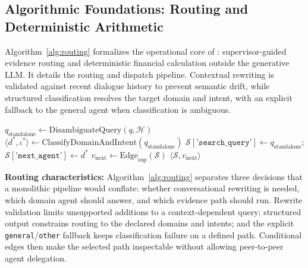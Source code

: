 \subsection{Algorithmic Foundations: Routing and Deterministic Arithmetic}
\label{sec:algorithms}

Algorithm~\ref{alg:routing} formalizes the operational core of \system{}: supervisor-guided evidence routing and deterministic financial calculation outside the generative LLM. It details the routing and dispatch pipeline. Contextual rewriting is validated against recent dialogue history to prevent semantic drift, while structured classification resolves the target domain and intent, with an explicit fallback to the general agent when classification is ambiguous.

\begin{algorithm}[!htbp]
\scriptsize
\SetAlFnt{\scriptsize}
\SetAlCapFnt{\scriptsize}
\SetAlCapNameFnt{\scriptsize}
\SetAlgoVlined
\LinesNumbered
\caption{Supervisor Intent Routing and Dispatch}
\label{alg:routing}
$q_{\text{standalone}} \leftarrow \mathrm{DisambiguateQuery}(q, \mathcal{H})$\;
$\langle d^*, \iota^* \rangle \leftarrow \mathrm{ClassifyDomainAndIntent}(q_{\text{standalone}})$\;
$\mathcal{S}[\texttt{'search\_query'}] \leftarrow q_{\text{standalone}}$;\quad $\mathcal{S}[\texttt{'next\_agent'}] \leftarrow d^*$\;
$v_{\text{next}} \leftarrow \mathrm{Edge}_{\text{sup}}(\mathcal{S})$ 
\Return $\langle \mathcal{S}, v_{\text{next}} \rangle$\;
\end{algorithm}

\textbf{Routing characteristics:}
Algorithm~\ref{alg:routing} separates three decisions that a monolithic pipeline would conflate: whether conversational rewriting is needed, which domain agent should answer, and which evidence path should run. Rewrite validation limits unsupported additions to a context-dependent query; structured output constrains routing to the declared domains and intents; and the explicit \texttt{general}/\texttt{other} fallback keeps classification failure on a defined path. Conditional edges then make the selected path inspectable without allowing peer-to-peer agent delegation.

